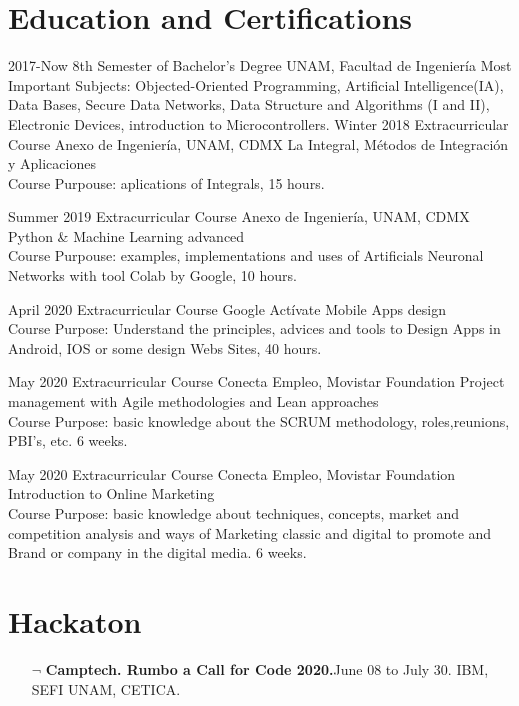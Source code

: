 \documentclass[]{friggeri-cv}
\begin{document}
\section{Education and Certifications}
\begin{entrylist}
\entry
    {2017-Now}
    {8th Semester of Bachelor's Degree}
    {UNAM, Facultad de Ingeniería}
    {Most Important Subjects: Objected-Oriented Programming, Artificial Intelligence(IA), Data Bases, Secure Data Networks, Data Structure and Algorithms (I and II), Electronic Devices, introduction to Microcontrollers.
    }
\entry
    {Winter 2018}
    {Extracurricular Course}
    {Anexo de Ingeniería, UNAM, CDMX}
    {La Integral, Métodos de Integración y Aplicaciones\\
    Course Purpouse: aplications of Integrals, 15 hours.}

\entry
    {Summer 2019}
    {Extracurricular Course}
    {Anexo de Ingeniería, UNAM, CDMX}
    {Python \& Machine Learning advanced\\
    Course Purpouse: examples, implementations and uses of Artificials Neuronal Networks with tool Colab by Google, 10 hours.}
    
\entry
    {April 2020}
    {Extracurricular Course}
    {Google Actívate}
    {Mobile Apps design\\
    Course Purpose: Understand the principles, advices and tools to Design Apps in Android, IOS or some design Webs Sites, 40 hours.}
    
\entry
    {May 2020}
    {Extracurricular Course}
    {Conecta Empleo, Movistar Foundation}
    {Project management with Agile methodologies and Lean approaches\\
    Course Purpose: basic knowledge about the SCRUM methodology, roles,reunions, PBI's, etc. 6 weeks.}    

\entry
    {May 2020}
    {Extracurricular Course}
    {Conecta Empleo, Movistar Foundation}
    {Introduction to Online Marketing\\
    Course Purpose: basic knowledge about techniques, concepts, market and competition analysis and ways of Marketing classic and digital to promote and Brand or company in the digital media. 6 weeks. }

\end{entrylist}

\section{Hackaton}
\begin{itemize}
    \item[$¬$] \textbf{Camptech. Rumbo a Call for Code 2020.}June 08 to July 30. IBM, SEFI UNAM, CETICA. 
\end{itemize}
\end{document}
